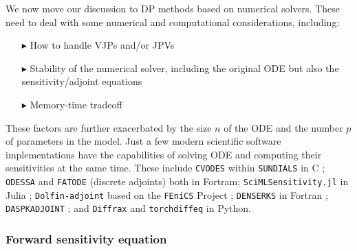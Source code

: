 We now move our discussion to DP methods based on numerical solvers.
These need to deal with some numerical and computational considerations, including:
\begin{enumerate}
    \item[$ \blacktriangleright$] How to handle VJPs and/or JPVs 
    \item[$ \blacktriangleright$] Stability of the numerical solver, including the original ODE but also the sensitivity/adjoint equations
    \item[$ \blacktriangleright$] Memory-time tradeoff
\end{enumerate}
These factors are further exacerbated by the size $n$ of the ODE and the number $p$ of parameters in the model. 
Just a few modern scientific software implementations have the capabilities of solving ODE and computing their sensitivities at the same time. 
These include 
\texttt{CVODES} within \texttt{SUNDIALS} in C \cite{serban2005cvodes, SUNDIALS-hindmarsh2005sundials}; 
\texttt{ODESSA} \cite{ODESSA} and \texttt{FATODE} (discrete adjoints) \cite{FATODE2014} both in Fortram; 
\texttt{SciMLSensitivity.jl} in Julia \cite{rackauckas2020universal}; 
\texttt{Dolfin-adjoint} based on the \texttt{FEniCS} Project \cite{dolfin2013, dolfin2018};
\texttt{DENSERKS} in Fortran \cite{alexe2007denserks}; 
\texttt{DASPKADJOINT} \cite{Cao_Li_Petzold_2002};
and \texttt{Diffrax} \cite{kidger2021on} and \texttt{torchdiffeq} \cite{torchdiffeq} in Python. 


\subsubsection{Forward sensitivity equation}
\label{section:computing-sensitivity-equations}


